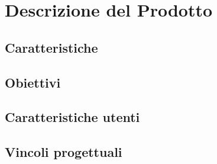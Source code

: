 \section{Descrizione del Prodotto}
\subsection{Caratteristiche}
\subsection{Obiettivi}
\subsection{Caratteristiche utenti}
\subsection{Vincoli progettuali}
